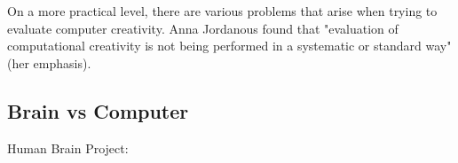 On a more practical level, there are various problems that arise when trying to evaluate computer creativity. Anna Jordanous found that "evaluation of computational creativity is not being performed in a systematic or standard way" \citep[p.2]{Jordanous2011}(her emphasis).

\subsection{Brain vs Computer}

Human Brain Project: \citep{Walker2012}

